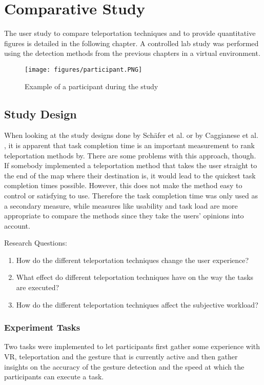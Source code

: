 \chapter{Comparative Study}
The user study to compare teleportation techniques and to provide quantitative figures is detailed in the following chapter. A controlled lab study was performed using the detection methods from the previous chapters in a virtual environment. 

\begin{figure}[!ht]
    \centering
    \texttt{[image: figures/participant.PNG]}
    \caption{Example of a participant during the study}
    \label{fig:video}
\end{figure}

\section{Study Design}
When looking at the study designs done by Schäfer et al. \cite{Schafer2021} or by Caggianese et al. \cite{Caggianese}, it is apparent that task completion time is an important measurement to rank teleportation methods by. There are some problems with this approach, though. If somebody implemented a teleportation method that takes the user straight to the end of the map where their destination is, it would lead to the quickest task completion times possible. However, this does not make the method easy to control or satisfying to use. Therefore the task completion time was only used as a secondary measure, while measures like usability and task load are more appropriate to compare the methods since they take the users' opinions into account. 

Research Questions:
\begin{enumerate}
    \item How do the different teleportation techniques change the user experience?
    \item What effect do different teleportation techniques have on the way the tasks are executed?
    \item How do the different teleportation techniques affect the subjective workload?
\end{enumerate}

\subsection{Experiment Tasks}
Two tasks were implemented to let participants first gather some experience with VR, teleportation and the gesture that is currently active and then gather insights on the accuracy of the gesture detection and the speed at which the participants can execute a task.

